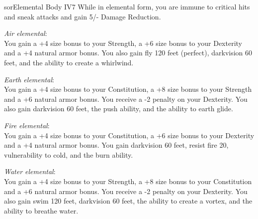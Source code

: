 \begin{spellcard}{sor}{Elemental Body IV}{7}
  While in elemental form, you are immune to critical hits and sneak attacks and gain 5/- Damage Reduction.

  \vfill{}
  \emph{Air elemental}:\\
  You gain a +4 size bonus to your Strength,
  a +6 size bonus to your Dexterity and a +4 natural armor bonus.
  You also gain fly 120 feet (perfect), darkvision 60 feet, and the ability to create a whirlwind.

  \emph{Earth elemental}:\\
  You gain a +4 size bonus to your Constitution,
  a +8 size bonus to your Strength and a +6 natural armor bonus.
  You receive a -2 penalty on your Dexterity.
  You also gain darkvision 60 feet, the push ability, and the ability to earth glide.

  \emph{Fire elemental}:\\
  You gain a +4 size bonus to your Constitution,
  a +6 size bonus to your Dexterity and a +4 natural armor bonus.
  You gain darkvision 60 feet, resist fire 20, vulnerability to cold, and the burn ability.

  \emph{Water elemental}:\\
  You gain a +4 size bonus to your Strength,
  a +8 size bonus to your Constitution and a +6 natural armor bonus.
  You receive a -2 penalty on your Dexterity.
  You also gain swim 120 feet, darkvision 60 feet, the ability to create a vortex, and the ability to breathe water.

\end{spellcard}
